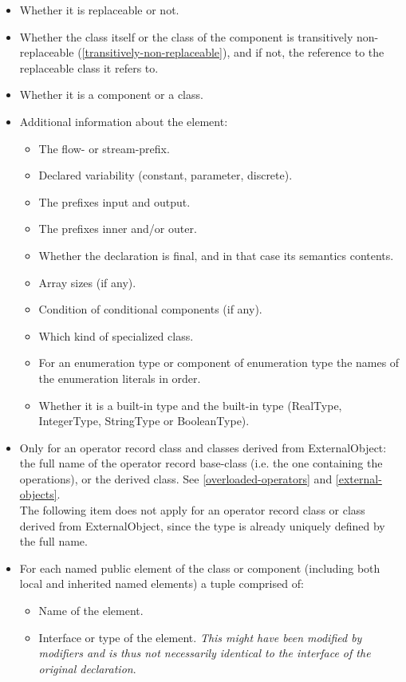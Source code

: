 \documentclass[10pt,a4paper]{report}
\begin{document}
\begin{itemize}
\item
  Whether it is replaceable or not.
\item
  Whether the class itself or the class of the component is transitively
  non-replaceable (\ref{transitively-non-replaceable}), and if not, the reference to the
  replaceable class it refers to.
\item
  Whether it is a component or a class.
\item
  Additional information about the element:

  \begin{itemize}
  \item
    The flow- or stream-prefix.
  \item
    Declared variability (constant, parameter, discrete).
  \item
    The prefixes input and output.
  \item
    The prefixes inner and/or outer.
  \item
    Whether the declaration is final, and in that case its semantics
    contents.
  \item
    Array sizes (if any).
  \item
    Condition of conditional components (if any).
  \item
    Which kind of specialized class.
  \item
    For an enumeration type or component of enumeration type the names
    of the enumeration literals in order.
  \item
    Whether it is a built-in type and the built-in type (RealType,
    IntegerType, StringType or BooleanType).
  \end{itemize}
\item
  Only for an operator record class and classes derived from
  ExternalObject: the full name of the operator record base-class (i.e.
  the one containing the operations), or the derived class. See 
  \ref{overloaded-operators} and \ref{external-objects}.\\
  The following item does not apply for an operator record class or
  class derived from ExternalObject, since the type is already uniquely
  defined by the full name.
\item
  For each named public element of the class or component (including
  both local and inherited named elements) a tuple comprised of:

  \begin{itemize}
  \item
    Name of the element.
  \item
    Interface or type of the element. \emph{This might have been
    modified by modifiers and is thus not necessarily identical to the
    interface of the original declaration}.
  \end{itemize}
\end{itemize}
\end{document}
